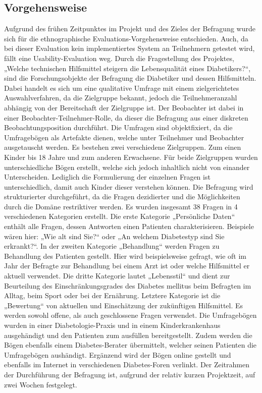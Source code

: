 \documentclass[a4paper,11pt]{article}%
\renewcommand{\\}{\vspace*{0.5\baselineskip} \newline}
\begin{document}
	\subsection{Vorgehensweise}
	Aufgrund des frühen Zeitpunktes im Projekt und des Zieles der Befragung wurde sich für die ethnographische Evaluations-Vorgehensweise entschieden. Auch, da bei dieser Evaluation kein implementiertes System an Teilnehmern getestet wird, fällt eine Usability-Evaluation weg. Durch die Fragestellung des Projektes, „Welche technischen Hilfsmittel steigern die Lebensqualität eines Diabetikers?“, sind die Forschungsobjekte der Befragung die Diabetiker und dessen Hilfsmitteln. Dabei handelt es sich um eine qualitative Umfrage mit einem zielgerichtetes Auswahlverfahren, da die Zielgruppe bekannt, jedoch die Teilnehmeranzahl abhängig von der Bereitschaft der Zielgruppe ist. Der Beobachter ist dabei in einer Beobachter-Teilnehmer-Rolle, da dieser die Befragung aus einer diskreten Beobachtungsposition durchführt. Die Umfragen sind objektfixiert, da die Umfragebögen als Artefakte dienen, welche unter Teilnehmer und Beobachter ausgetauscht werden.\newline
	Es bestehen zwei verschiedene Zielgruppen. Zum einen Kinder bis 18 Jahre und zum anderen Erwachsene. Für beide Zielgruppen wurden unterschiedliche Bögen erstellt, welche sich jedoch inhaltlich nicht von einander Unterscheiden. Lediglich die Formulierung der einzelnen Fragen ist unterschiedlich, damit auch Kinder dieser verstehen können.\newline
	Die Befragung wird strukturierter durchgeführt, da die Fragen dezidierter und die Möglichkeiten durch die Domäne restriktiver werden. Es wurden insgesamt 38 Fragen in 4 verschiedenen Kategorien erstellt. Die erste Kategorie „Persönliche Daten“ enthält alle Fragen, dessen Antworten einen Patienten charakterisieren.\newline
	Beispiele wären hier: „Wie alt sind Sie?“ oder „An welchem Diabetestyp sind Sie erkrankt?“. In der zweiten Kategorie „Behandlung“ werden Fragen zu Behandlung des Patienten gestellt. Hier wird beispielsweise gefragt, wie oft im Jahr der Befragte zur Behandlung bei einem Arzt ist oder welche Hilfsmittel er aktuell verwendet. Die dritte Kategorie lautet „Lebensstil“ und dient zur Beurteilung des Einschränkungsgrades des Diabetes mellitus beim Befragten im Alltag, beim Sport oder bei der Ernährung. Letztere Kategorie ist die „Bewertung“ von aktuellen und Einschätzung der zukünftigen Hilfsmittel.\newline
	Es werden sowohl offene, als auch geschlossene Fragen verwendet. Die Umfragebögen wurden in einer Diabetologie-Praxis und in einem Kinderkrankenhaus ausgehändigt und den Patienten zum ausfüllen bereitgestellt. Zudem werden die Bögen
	ebenfalls einem Diabetes-Berater übermittelt, welcher seinen Patienten die Umfragebögen aushändigt. Ergänzend wird der Bögen online gestellt und ebenfalls im Internet in verschiedenen Diabetes-Foren verlinkt. Der Zeitrahmen der Durchführung der Befragung ist, aufgrund der relativ kurzen Projektzeit, auf zwei Wochen festgelegt.
\end{document}
